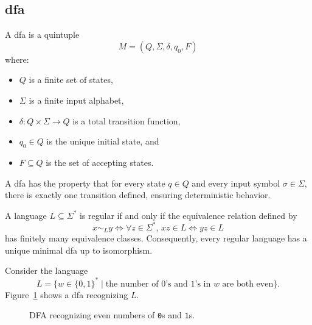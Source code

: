 
\subsection{\acrfull{dfa}}
\label{subsec:dfa}

\begin{definition}
A \gls{dfa} is a quintuple 
\[
M = (Q, \Sigma, \delta, q_0, F)
\]
where:
\begin{itemize}
    \item \( Q \) is a finite set of states,
    \item \( \Sigma \) is a finite input alphabet,
    \item \( \delta: Q \times \Sigma \rightarrow Q \) is a total transition function,
    \item \( q_0 \in Q \) is the unique initial state, and
    \item \( F \subseteq Q \) is the set of accepting states.
\end{itemize}
\end{definition}

\begin{remark}
A \gls{dfa} has the property that for every state \( q \in Q \) and every input symbol \( \sigma \in \Sigma \), there is exactly one transition defined, ensuring deterministic behavior.
\end{remark}

\begin{theorem}
\label{thm:myhill-nerode}
A language \( L \subseteq \Sigma^* \) is regular if and only if the equivalence relation defined by 
\[
x \sim_L y \iff \forall z \in \Sigma^*,\, xz \in L \Longleftrightarrow yz \in L
\]
has finitely many equivalence classes. Consequently, every regular language has a unique minimal \gls{dfa} up to isomorphism.
\end{theorem}

\begin{example}
Consider the language 
\[
L = \{ w \in \{0,1\}^* \mid \text{the number of \(0\)'s and \(1\)'s in \(w\) are both even} \}.
\]
Figure~\ref{fig:dfa-example} shows a \gls{dfa} recognizing \( L \).
\end{example}

\begin{figure}[h]
    \centering  
    \caption{DFA recognizing even numbers of \texttt{0}s and \texttt{1}s.}
    \label{fig:dfa-example}
\end{figure}

